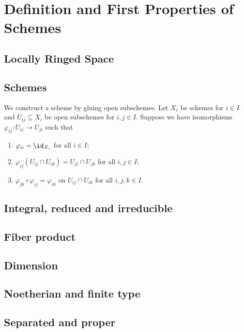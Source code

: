 \section{Definition and First Properties of Schemes}


\subsection{Locally Ringed Space}


\subsection{Schemes}

    \begin{example}\label{eg:glue_open_subschemes}
        We construct a scheme by gluing open subschemes.
        Let \(X_i\) be schemes for \(i \in I\) and \(U_{ij} \subseteq X_i\) be open subschemes for \(i,j \in I\).
        Suppose we have isomorphisms \(\varphi_{ij} : U_{ij} \to U_{ji}\) such that
        \begin{enumerate}
            \item \(\varphi_{ii} = \id_{X_i}\) for all \(i \in I\);
            \item \(\varphi_{ij}(U_{ij} \cap U_{ik}) = U_{ji} \cap U_{jk}\) for all \(i,j \in I\);
            \item \(\varphi_{jk}\circ \varphi_{ij} = \varphi_{ik}\) on \(U_{ij} \cap U_{ik}\) for all \(i,j,k \in I\).
        \end{enumerate}
        \Yang{}
    \end{example}

\subsection{Integral, reduced and irreducible}

\subsection{Fiber product}

\subsection{Dimension}

\subsection{Noetherian and finite type}

\subsection{Separated and proper}

